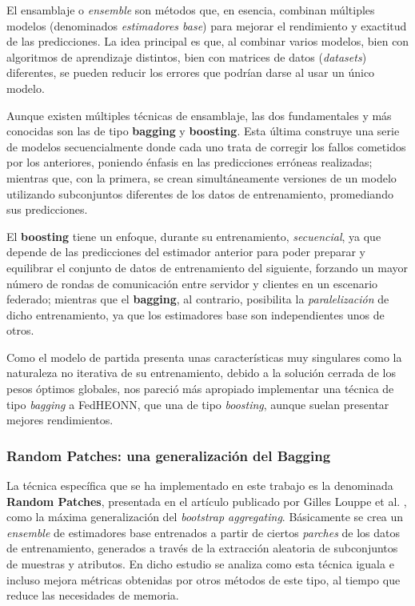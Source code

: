 \documentclass[00-Trabajo_Final.tex]{subfiles}
\begin{document}
\vspace{0.5em}

El ensamblaje o \textit{ensemble} son métodos que, en esencia, combinan múltiples modelos (denominados \textit{estimadores base}) para mejorar el rendimiento y exactitud de las predicciones. La idea principal es que, al combinar varios modelos, bien con algoritmos de aprendizaje distintos, bien con matrices de datos (\textit{datasets}) diferentes, se pueden reducir los errores que podrían darse al usar un único modelo.

Aunque existen múltiples técnicas de ensamblaje, las dos fundamentales y más conocidas son las de tipo \textbf{bagging} y \textbf{boosting}. Esta última construye una serie de modelos secuencialmente donde cada uno trata de corregir los fallos cometidos por los anteriores, poniendo énfasis en las predicciones erróneas realizadas; mientras que, con la primera, se crean simultáneamente versiones de un modelo utilizando subconjuntos diferentes de los datos de entrenamiento, promediando sus predicciones.

El \textbf{boosting} tiene un enfoque, durante su entrenamiento,  \textit{secuencial}, ya que depende de las predicciones del estimador anterior para poder preparar y equilibrar el conjunto de datos de entrenamiento del siguiente, forzando un mayor número de rondas de comunicación entre servidor y clientes en un escenario federado; mientras que el \textbf{bagging}, al contrario, posibilita la \textit{paralelización} de dicho entrenamiento, ya que los estimadores base son independientes unos de otros.

Como el modelo de partida presenta unas características muy singulares como la naturaleza no iterativa de su entrenamiento, debido a la solución cerrada de los pesos óptimos globales, nos pareció más apropiado implementar una técnica de tipo \textit{bagging} a FedHEONN, que una de tipo \textit{boosting}, aunque suelan presentar mejores rendimientos.

\subsubsection*{Random Patches: una generalización del Bagging} \label{sec:random_patches_sol}

La técnica específica que se ha implementado en este trabajo es la denominada \textbf{Random Patches}, presentada en el artículo publicado por Gilles Louppe et al. \cite{random_patches}, como la máxima generalización del \textit{bootstrap aggregating}. Básicamente se crea un \textit{ensemble} de estimadores base entrenados a partir de ciertos \textit{parches} de los datos de entrenamiento, generados a través de la extracción aleatoria de subconjuntos de muestras y atributos. En dicho estudio se analiza como esta técnica iguala e incluso mejora métricas obtenidas por otros métodos de este tipo, al tiempo que reduce las necesidades de memoria.
\end{document}
